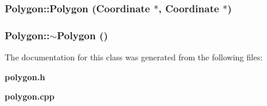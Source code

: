 \subsubsection{\setlength{\rightskip}{0pt plus 5cm}Polygon::Polygon ({\bf Coordinate} $\ast$, {\bf Coordinate} $\ast$)}\label{classPolygon_a1}


\subsubsection{\setlength{\rightskip}{0pt plus 5cm}Polygon::$\sim$Polygon ()}\label{classPolygon_a2}




The documentation for this class was generated from the following files:\begin{CompactItemize}
\item 
{\bf polygon.h}\item 
{\bf polygon.cpp}\end{CompactItemize}
